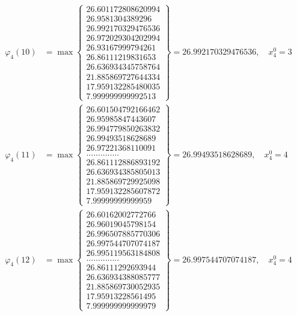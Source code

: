 \documentclass{article}
\begin{document}
\begin{align*}
  
  
  
\varphi_{4}(10) &= \max \left\{ \begin{array}{c}
26.601172808620994 \\
 26.9581304389296 \\
 26.992170329476536 \\
 26.972029304202994 \\
 26.93167999794261 \\
 26.86111219831653 \\
 26.636934345758764 \\
 21.885869727644334 \\
 17.959132285480035 \\
 7.999999999992513
\end{array} \right\} = 26.992170329476536, \quad x_{4}^0 = 3\\
  
  
  
  
\varphi_{4}(11) &= \max \left\{ \begin{array}{c}
26.601504792166462 \\
 26.95985847443607 \\
 26.994779850263832 \\
 26.99493518628689 \\
 26.97221368110091 \\
 .............. \\
 26.861112886893192 \\
 26.636934385805013 \\
 21.885869729925098 \\
 17.959132285607872 \\
 7.99999999999959
\end{array} \right\} = 26.99493518628689, \quad x_{4}^0 = 4\\
  
  
  
  
\varphi_{4}(12) &= \max \left\{ \begin{array}{c}
26.60162002772766 \\
 26.96019045798154 \\
 26.996507885770306 \\
 26.997544707074187 \\
 26.995119563184808 \\
 .............. \\
 26.86111292693944 \\
 26.636934388085777 \\
 21.885869730052935 \\
 17.95913228561495 \\
 7.999999999999979
\end{array} \right\} = 26.997544707074187, \quad x_{4}^0 = 4\\
  

\end{align*}
\end{document}
